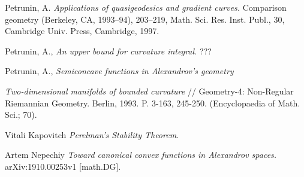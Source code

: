 \documentclass[a4paper,10pt]{article}
\begin{document}
\begin{thebibliography}{52}
 Petrunin, A. \textit{Applications of quasigeodesics and gradient curves.} Comparison geometry (Berkeley, CA, 1993–94), 203--219, Math. Sci. Res. Inst. Publ., 30, Cambridge Univ. Press, Cambridge, 1997.

 Petrunin, A., \textit{An upper bound for curvature integral.} ???

 Petrunin, A., \textit{Semiconcave functions in Alexandrov's geometry}

 \textit{ Two-dimensional manifolds of bounded curvature} // Geometry-4: Non-Regular Riemannian Geometry. Berlin, 1993. P. 3-163, 245-250. (Encyclopaedia of Math. Sci.; 70). 

Vitali Kapovitch \textit{Perelman's Stability Theorem.}

 Artem Nepechiy \textit{Toward canonical convex functions in Alexandrov spaces.} arXiv:1910.00253v1 [math.DG].
\end{thebibliography}
\end{document}

